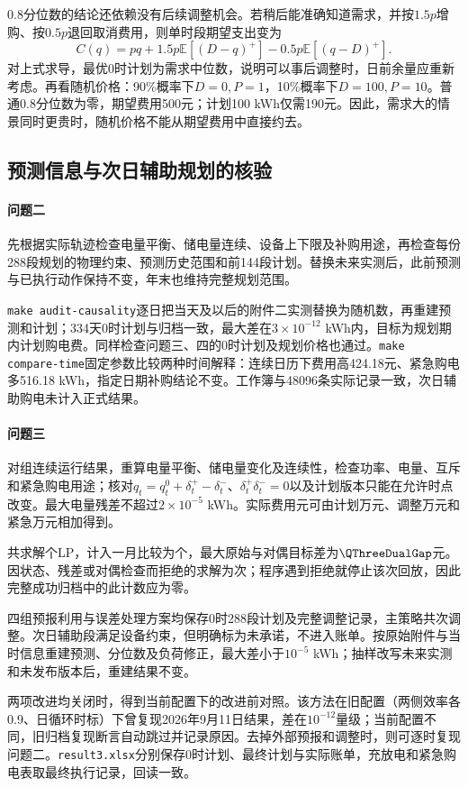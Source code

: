 0.8分位数的结论还依赖没有后续调整机会。若稍后能准确知道需求，并按$1.5p$增购、按$0.5p$退回取消费用，则单时段期望支出变为
\[
 C(q)=pq+1.5p\mathbb E[(D-q)^+]-0.5p\mathbb E[(q-D)^+].
\]
对上式求导，最优0时计划为需求中位数，说明可以事后调整时，日前余量应重新考虑。再看随机价格：90\%概率下$D=0,P=1$，10\%概率下$D=100,P=10$。普通0.8分位数为零，期望费用500元；计划100 kWh仅需190元。因此，需求大的情景同时更贵时，随机价格不能从期望费用中直接约去。

\subsection{预测信息与次日辅助规划的核验}

\paragraph{问题二}
先根据实际轨迹检查电量平衡、储电量连续、设备上下限及补购用途，再检查每份288段规划的物理约束、预测历史范围和前144段计划。替换未来实测后，此前预测与已执行动作保持不变，年末也维持完整规划范围。\par \texttt{make audit-causality}逐日把当天及以后的附件二实测替换为随机数，再重建预测和计划；334天0时计划与归档一致，最大差在$3\times10^{-12}$ kWh内，目标为规划期内计划购电费。同样检查问题三、四的0时计划及规划价格也通过。\texttt{make compare-time}固定参数比较两种时间解释：连续日历下费用高424.18元、紧急购电多516.18 kWh，指定日期补购结论不变。工作簿与48096条实际记录一致，次日辅助购电未计入正式结果。

\paragraph{问题三}
对\QThreeStrategyCount 组连续运行结果，重算电量平衡、储电量变化及连续性，检查功率、电量、互斥和紧急购电用途；核对$q_t=q_t^0+\delta_t^+-\delta_t^-$、$\delta_t^+\delta_t^-=0$以及计划版本只能在允许时点改变。最大电量残差不超过$2\times10^{-5}$ kWh。实际费用\QThreeCash 元可由计划\QThreePlanCost 万元、调整\QThreeAdjustCost 万元和紧急\QThreeEmergencyCost 万元相加得到。\par 共求解\QThreeLPSolves 个LP，计入一月比较为\QThreeLPSolvesTotal 个，最大原始与对偶目标差为$\QThreeDualGap$元。因状态、残差或对偶检查而拒绝的求解为\QThreeSolverFailures 次；程序遇到拒绝就停止该次回放，因此完整成功归档中的此计数应为零。\par 四组预报利用与误差处理方案均保存0时288段计划及完整调整记录，主策略共\QThreeAdjustmentRecords 次调整。次日辅助段满足设备约束，但明确标为未承诺，不进入账单。按原始附件与当时信息重建预测、分位数及负荷修正，最大差小于$10^{-5}$ kWh；抽样改写未来实测和未发布版本后，重建结果不变。\par 两项改进均关闭时，得到当前配置下的改进前对照。该方法在旧配置（两侧效率各0.9、日循环时标）下曾复现2026年9月11日结果，差在$10^{-12}$量级；当前配置不同，旧归档复现断言自动跳过并记录原因。去掉外部预报和调整时，则可逐时复现问题二。\texttt{result3.xlsx}分别保存0时计划、最终计划与实际账单，充放电和紧急购电表取最终执行记录，回读一致。


